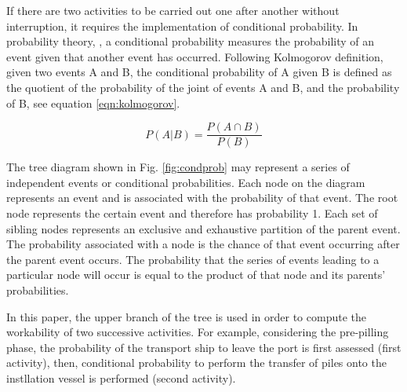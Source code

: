 If there are two activities to be carried out one after another without interruption, it requires the implementation of conditional probability.  
In probability theory, \cite{Thalemann2012}, a conditional probability measures the probability of an event given that another event has occurred. Following Kolmogorov definition, given two events A and B, the conditional probability of A given B is defined as the quotient of the probability of the joint of events A and B, and the probability of B, see equation \ref{eqn:kolmogorov}.

\begin{equation}
\label{eqn:kolmogorov}
P \left(A \vert B \right) = \frac{P \left(A \cap B \right)}{P \left( B \right)}
\end{equation}

The tree diagram shown in Fig. \ref{fig:condprob} may represent a series of independent events or conditional probabilities. Each node on the diagram represents an event and is associated with the probability of that event. The root node represents the certain event and therefore has probability 1. Each set of sibling nodes represents an exclusive and exhaustive partition of the parent event. The probability associated with a node is the chance of that event occurring after the parent event occurs. The probability that the series of events leading to a particular node will occur is equal to the product of that node and its parents' probabilities.

In this paper, the upper branch of the tree is used in order to compute the workability of two successive activities. For example, considering the pre-pilling phase, the probability of the transport ship to leave the port is first assessed (first activity), then, conditional probability to perform the transfer of piles onto the instllation vessel is performed (second activity).